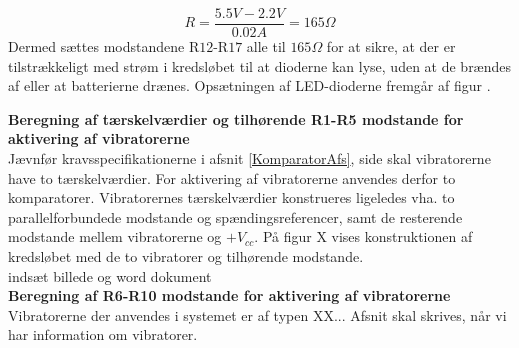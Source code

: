 \begin{equation}
R = \dfrac{5.5V - 2.2V}{0.02A} = 165\Omega
\end{equation}
\noindent Dermed sættes modstandene R$12$-R$17$ alle til $165\Omega$ for at sikre, at der er tilstrækkeligt med strøm i kredsløbet til at dioderne kan lyse, uden at de brændes af eller at batterierne drænes. Opsætningen af LED-dioderne fremgår af figur .

\noindent\textbf{Beregning af tærskelværdier og tilhørende R1-R5 modstande for aktivering af  vibratorerne} \\
Jævnfør kravsspecifikationerne i afsnit \ref{KomparatorAfs}, side \pageref{KomparatorAfs} skal vibratorerne have to tærskelværdier. For aktivering af vibratorerne anvendes derfor to komparatorer. Vibratorernes tærskelværdier konstrueres ligeledes vha. to parallelforbundede modstande og spændingsreferencer, samt de resterende modstande mellem vibratorerne og $+V_{cc}$. På figur X vises konstruktionen af kredsløbet med de to vibratorer og tilhørende modstande. \\

indsæt billede og word dokument \\

\noindent\textbf{Beregning af R6-R10 modstande for aktivering af vibratorerne} \\
Vibratorerne der anvendes i systemet er af typen XX... Afsnit skal skrives, når vi har information om vibratorer.  \\


